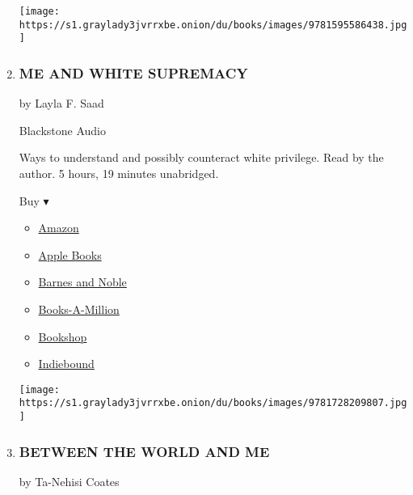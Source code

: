 \begin{enumerate}
  \texttt{[image: https://s1.graylady3jvrrxbe.onion/du/books/images/9781595586438.jpg]}
\item
  \hypertarget{me-and-white-supremacy}{%
  \subsubsection{ME AND WHITE SUPREMACY}\label{me-and-white-supremacy}}

  by Layla F. Saad

  Blackstone Audio

  Ways to understand and possibly counteract white privilege. Read by
  the author. 5 hours, 19 minutes unabridged.

  Buy ▾

  \begin{itemize}
  \tightlist
  \item
    \href{https://www.amazon.com/Me-White-Supremacy-Combat-Ancestor/dp/1728209803?tag=NYTBS-20}{Amazon}
  \item
    \href{https://du-gae-books-dot-nyt-du-prd.appspot.com/buy?title=ME+AND+WHITE+SUPREMACY\&author=Layla+F+Saad}{Apple
    Books}
  \item
    \href{https://www.anrdoezrs.net/click-7990613-11819508?url=https\%3A\%2F\%2Fwww.barnesandnoble.com\%2Fw\%2F\%3Fean\%3D9781094135465}{Barnes
    and Noble}
  \item
    \href{https://www.anrdoezrs.net/click-7990613-35140?url=https\%3A\%2F\%2Fwww.booksamillion.com\%2Fp\%2FME\%2BAND\%2BWHITE\%2BSUPREMACY\%2FLayla\%2BF\%2BSaad\%2F9781094135465}{Books-A-Million}
  \item
    \href{https://bookshop.org/a/3546/9781094135465}{Bookshop}
  \item
    \href{https://www.indiebound.org/book/9781094135465?aff=NYT}{Indiebound}
  \end{itemize}

  \texttt{[image: https://s1.graylady3jvrrxbe.onion/du/books/images/9781728209807.jpg]}
\item
  \href{https://www.nytimes3xbfgragh.onion/2015/08/17/books/review/ta-nehisi-coatess-between-the-world-and-me.html}{}

  \hypertarget{between-the-world-and-me}{%
  \subsubsection{BETWEEN THE WORLD AND
  ME}\label{between-the-world-and-me}}

  by Ta-Nehisi Coates


\end{enumerate}
